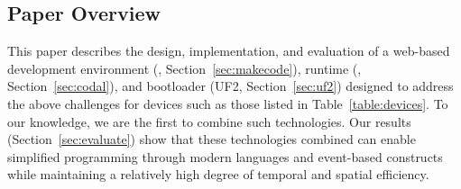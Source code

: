 \subsection{Paper Overview}
This paper describes the design, implementation, and evaluation of a web-based development environment (\MCN, Section~\ref{sec:makecode}), runtime (\CON, Section~\ref{sec:codal}), and bootloader (UF2, Section~\ref{sec:uf2}) designed to address the above challenges for devices such as those listed in Table~\ref{table:devices}. To our knowledge, we are the first to combine such technologies. Our results (Section~\ref{sec:evaluate}) show that these technologies combined can enable simplified programming through modern languages and event-based constructs while maintaining a relatively high degree of temporal and spatial efficiency.










